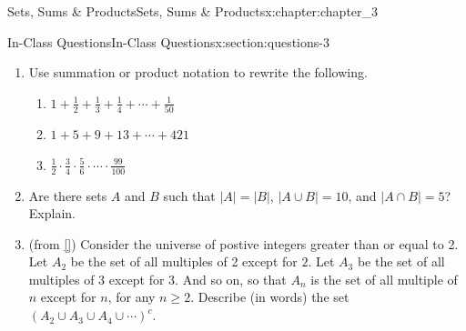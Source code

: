 \documentclass[oneside,10pt,]{book}
\newcommand{\xreffont}{\relax}
\numberwithin{equation}{section}
\begin{document}
\begin{chapterptx}{Sets, Sums \& Products}{}{Sets, Sums \& Products}{}{}{x:chapter:chapter_3}
\begin{sectionptx}{In-Class Questions}{}{In-Class Questions}{}{}{x:section:questions-3}
\begin{enumerate}[label=\arabic*.]
\item{}Use summation or product notation to rewrite the following.%
\begin{enumerate}[label=(\alph*)]
\item{}\(1 + \frac{1}{2} + \frac{1}{3}+ \frac{1}{4}+ \cdots + \frac{1}{50}\)%
\item{}\(1 + 5 + 9 + 13 + \cdots + 421\)%
\item{}\(\frac{1}{2}\cdot \frac{3}{4}\cdot \frac{5}{6}\cdot \cdots 			 
\cdot\frac{99}{100}\)%
\end{enumerate}
%
\item{}Are there sets \(A\) and \(B\) such that \(|A| = |B|\), \(|A\cup B| = 10\), and \(|A\cap B| = 5\)?  Explain.%
\item{}(from \hyperlink{x:biblio:biblio-levin-2020}{[{\xreffont 3}]}) Consider the universe of postive integers greater than or equal to 2. Let \(A_2\) be the set of all multiples of 2 except for \(2\). Let \(A_3\) be the set of all multiples of 3 except for 3. And so on, so that \(A_n\) is the set of all multiple of \(n\) except for \(n\), for any \(n \ge 2\). Describe (in words) the set \(\left(A_2 \cup A_3 \cup A_4 \cup \cdots \right)^c\).%
\end{enumerate}
%
\end{sectionptx}
\end{chapterptx}
%
%
\typeout{************************************************}
\typeout{************************************************}
%
\end{document}
